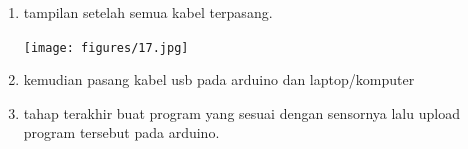 \documentclass{article}
\begin{document}
\begin{enumerate}
	\break
	\item tampilan setelah semua kabel terpasang.
	\break
	\centerline{\texttt{[image: figures/17.jpg]}}
	\break
	\item kemudian pasang kabel usb pada arduino dan laptop/komputer
	\break
	\item tahap terakhir buat program yang sesuai dengan sensornya lalu upload program tersebut pada arduino.


	
\end{enumerate}
\end{document}
